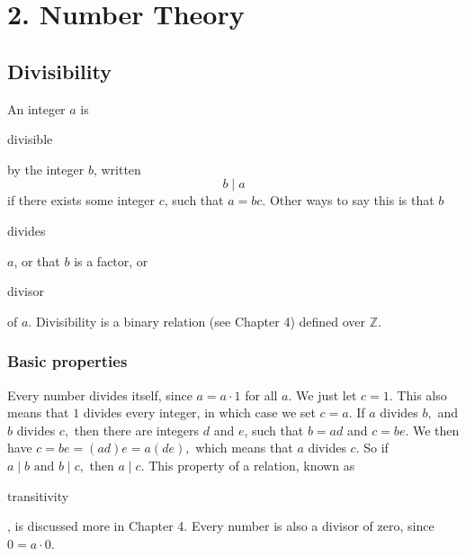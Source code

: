 \documentclass[11pt]{article}
\theoremstyle{plain}
\theoremstyle{definition}
\begin{document}
\section*{2. Number Theory}

\subsection*{Divisibility}

An integer $a$ is \begin{em}divisible\end{em} by the integer $b$, written 
$$b \mid a$$ 
if there exists some integer $c$, such that $ a = bc. $ Other ways to say this is that $b$ \begin{em}divides\end{em} $a$, or that $b$ is a factor, or \begin{em}divisor\end{em} of $a$. Divisibility is a binary relation (see Chapter 4) defined over $\mathbb{Z}$.

\subsubsection*{Basic properties}


Every number divides itself, since $a = a \cdot 1$ for all $a$. We just let $c = 1.$ This also means that $1$ divides every integer, in which case we set $c = a$. If $a$ divides $b,$ and $b$ divides $c,$ then there are integers $d$ and $e$, such that $b = ad$ and $c = be$. We then have $c = be = (ad)e = a(de),$ which means that $a$ divides $c.$ So if $a \mid b \text{ and } b \mid c,$ then $a \mid c.$ This property of a relation, known as \begin{em}transitivity\end{em}, is discussed more in Chapter 4. Every number is also a divisor of zero, since $0 = a \cdot 0$. 

% 




\end{document}
